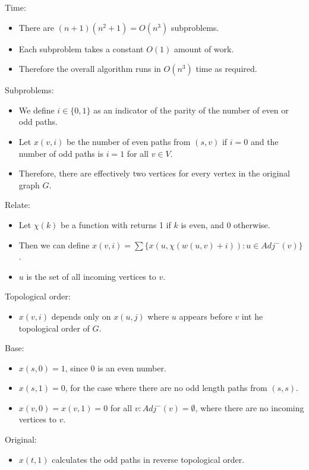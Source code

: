 \documentclass[12pt,twoside]{article}
\begin{document}
\begin{problems}
Time:
\begin{itemize}
    \item There are $(n+1)(n^2+1)=O(n^3)$ subproblems.
    \item Each subproblem takes a constant $O(1)$ amount of work.
    \item Therefore the overall algorithm runs in $O(n^3)$ time as required.
\end{itemize}

\newpage
\problem  %

Subproblems:
\begin{itemize}
    \item We define $i \in \{0, 1\}$ as an indicator of the parity of the number of even or odd paths.
    \item Let $x(v,i)$ be the number of even paths from $(s,v)$ if $i=0$ and the number of odd paths is $i=1$ for all $v \in V$.
    \item Therefore, there are effectively two vertices for every vertex in the original graph $G$.
\end{itemize}

Relate:
\begin{itemize}
    \item Let $\chi(k)$ be a function with returns 1 if $k$ is even, and 0 otherwise.
    \item Then we can define $x(v,i)=\sum \{x(u, \chi(w(u,v)+i)):u \in Adj^-(v)\}$.
    \item $u$ is the set of all incoming vertices to $v$.
\end{itemize}

Topological order:
\begin{itemize}
    \item $x(v,i)$ depends only on $x(u,j)$ where $u$ appears before $v$ int he topological order of $G$.
\end{itemize}

Base:
\begin{itemize}
    \item $x(s,0)=1$, since $0$ is an even number.
    \item $x(s,1)=0$, for the case where there are no odd length paths from $(s,s)$.
    \item $x(v,0)=x(v,1)=0$ for all $v: Adj^-(v)=\emptyset$, where there are no incoming vertices to $v$.
\end{itemize}

Original:
\begin{itemize}
    \item $x(t,1)$ calculates the odd paths in reverse topological order.
\end{itemize}


\end{problems}
\end{document}
